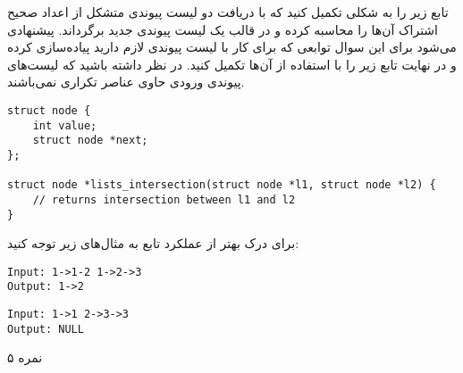 \documentclass[../main.tex]{subfiles}
\begin{document}
تابع زیر را به شکلی تکمیل کنید که با دریافت دو لیست پیوندی متشکل از اعداد صحیح اشتراک آن‌ها را محاسبه کرده و در قالب یک لیست پیوندی جدید برگرداند. پیشنهادی می‌شود برای این سوال توابعی که برای کار با لیست پیوندی لازم دارید پیاده‌سازی کرده و در نهایت تابع زیر را با استفاده از آن‌ها تکمیل کنید.
در نظر داشته باشید که لیست‌های پیوندی ورودی حاوی عناصر تکراری نمی‌باشند.

\begin{latin}
\begin{verbatim}
struct node {
    int value;
    struct node *next;
};

struct node *lists_intersection(struct node *l1, struct node *l2) {
    // returns intersection between l1 and l2
}
\end{verbatim}
\end{latin}

برای درک بهتر از عملکرد تابع به مثال‌های زیر توجه کنید:

\begin{latin}
\begin{verbatim}
Input: 1->1-2 1->2->3
Output: 1->2
\end{verbatim}

\begin{verbatim}
Input: 1->1 2->3->3
Output: NULL
\end{verbatim}
\end{latin}

۵ نمره
\end{document}
